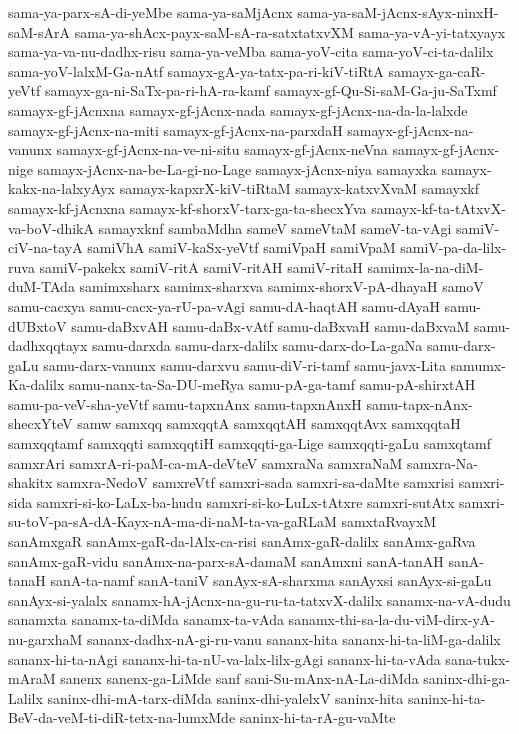 {sama-ya-parx-sA-di-yeMbe
sama-ya-saMjAcnx
sama-ya-saM-jAcnx-sAyx-ninxH-saM-sArA
sama-ya-shAcx-payx-saM-sA-ra-satxtatxvXM
sama-ya-vA-yi-tatxyayx
sama-ya-va-nu-dadhx-risu
sama-ya-veMba
sama-yoV-cita
sama-yoV-ci-ta-dalilx
sama-yoV-lalxM-Ga-nAtf
samayx-gA-ya-tatx-pa-ri-kiV-tiRtA
samayx-ga-caR-yeVtf
samayx-ga-ni-SaTx-pa-ri-hA-ra-kamf
samayx-gf-Qu-Si-saM-Ga-ju-SaTxmf
samayx-gf-jAcnxna
samayx-gf-jAcnx-nada
samayx-gf-jAcnx-na-da-la-lalxde
samayx-gf-jAcnx-na-miti
samayx-gf-jAcnx-na-parxdaH
samayx-gf-jAcnx-na-vanunx
samayx-gf-jAcnx-na-ve-ni-situ
samayx-gf-jAcnx-neVna
samayx-gf-jAcnx-nige
samayx-jAcnx-na-be-La-gi-no-Lage
samayx-jAcnx-niya
samayxka
samayx-kakx-na-lalxyAyx
samayx-kapxrX-kiV-tiRtaM
samayx-katxvXvaM
samayxkf
samayx-kf-jAcnxna
samayx-kf-shorxV-tarx-ga-ta-shecxYva
samayx-kf-ta-tAtxvX-va-boV-dhikA
samayxknf
sambaMdha
sameV
sameVtaM
sameV-ta-vAgi
samiV-ciV-na-tayA
samiVhA
samiV-kaSx-yeVtf
samiVpaH
samiVpaM
samiV-pa-da-lilx-ruva
samiV-pakekx
samiV-ritA
samiV-ritAH
samiV-ritaH
samimx-la-na-diM-duM-TAda
samimxsharx
samimx-sharxva
samimx-shorxV-pA-dhayaH
samoV
samu-cacxya
samu-cacx-ya-rU-pa-vAgi
samu-dA-haqtAH
samu-dAyaH
samu-dUBxtoV
samu-daBxvAH
samu-daBx-vAtf
samu-daBxvaH
samu-daBxvaM
samu-dadhxqqtayx
samu-darxda
samu-darx-dalilx
samu-darx-do-La-gaNa
samu-darx-gaLu
samu-darx-vanunx
samu-darxvu
samu-diV-ri-tamf
samu-javx-Lita
samumx-Ka-dalilx
samu-nanx-ta-Sa-DU-meRya
samu-pA-ga-tamf
samu-pA-shirxtAH
samu-pa-veV-sha-yeVtf
samu-tapxnAnx
samu-tapxnAnxH
samu-tapx-nAnx-shecxYteV
samw
samxqq
samxqqtA
samxqqtAH
samxqqtAvx
samxqqtaH
samxqqtamf
samxqqti
samxqqtiH
samxqqti-ga-Lige
samxqqti-gaLu
samxqtamf
samxrAri
samxrA-ri-paM-ca-mA-deVteV
samxraNa
samxraNaM
samxra-Na-shakitx
samxra-NedoV
samxreVtf
samxri-sada
samxri-sa-daMte
samxrisi
samxri-sida
samxri-si-ko-LaLx-ba-hudu
samxri-si-ko-LuLx-tAtxre
samxri-sutAtx
samxri-su-toV-pa-sA-dA-Kayx-nA-ma-di-naM-ta-va-gaRLaM
samxtaRvayxM
sanAmxgaR
sanAmx-gaR-da-lAlx-ca-risi
sanAmx-gaR-dalilx
sanAmx-gaRva
sanAmx-gaR-vidu
sanAmx-na-parx-sA-damaM
sanAmxni
sanA-tanAH
sanA-tanaH
sanA-ta-namf
sanA-taniV
sanAyx-sA-sharxma
sanAyxsi
sanAyx-si-gaLu
sanAyx-si-yalalx
sanamx-hA-jAcnx-na-gu-ru-ta-tatxvX-dalilx
sanamx-na-vA-dudu
sanamxta
sanamx-ta-diMda
sanamx-ta-vAda
sanamx-thi-sa-la-du-viM-dirx-yA-nu-garxhaM
sananx-dadhx-nA-gi-ru-vanu
sananx-hita
sananx-hi-ta-liM-ga-dalilx
sananx-hi-ta-nAgi
sananx-hi-ta-nU-va-lalx-lilx-gAgi
sananx-hi-ta-vAda
sana-tukx-mAraM
sanenx
sanenx-ga-LiMde
sanf
sani-Su-mAnx-nA-La-diMda
saninx-dhi-ga-Lalilx
saninx-dhi-mA-tarx-diMda
saninx-dhi-yalelxV
saninx-hita
saninx-hi-ta-BeV-da-veM-ti-diR-tetx-na-lumxMde
saninx-hi-ta-rA-gu-vaMte
}

